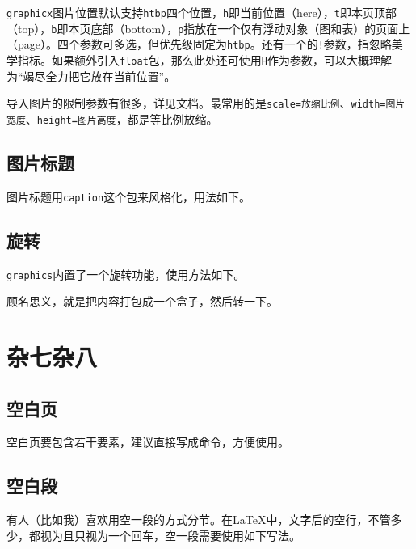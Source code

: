 \documentclass[10pt,openany]{book}
\begin{document}
\begin{sloppypar}
\texttt{graphicx}图片位置默认支持\texttt{htbp}四个位置，\texttt{h}即当前位置（here），\texttt{t}即本页顶部（top），\texttt{b}即本页底部（bottom），\texttt{p}指放在一个仅有浮动对象（图和表）的页面上（page）。四个参数可多选，但优先级固定为\texttt{htbp}。还有一个的\texttt{!}参数，指忽略美学指标。如果额外引入\texttt{float}包，那么此处还可使用\texttt{H}作为参数，可以大概理解为“竭尽全力把它放在当前位置”。

导入图片的限制参数有很多，详见文档。最常用的是\texttt{scale=放缩比例}、\texttt{width=图片宽度}、\texttt{height=图片高度}，都是等比例放缩。

\section{图片标题}

图片标题用\texttt{caption}这个包来风格化，用法如下。



\section{旋转}

\texttt{graphics}内置了一个旋转功能，使用方法如下。



顾名思义，就是把内容打包成一个盒子，然后转一下。

\chapter{杂七杂八}

\section{空白页}

空白页要包含若干要素，建议直接写成命令，方便使用。



\section{空白段}
\label{blankpar}

有人（比如我）喜欢用空一段的方式分节。在{\LaTeX}中，文字后的空行，不管多少，都视为且只视为一个回车，空一段需要使用如下写法。




\end{sloppypar}
\end{document}
